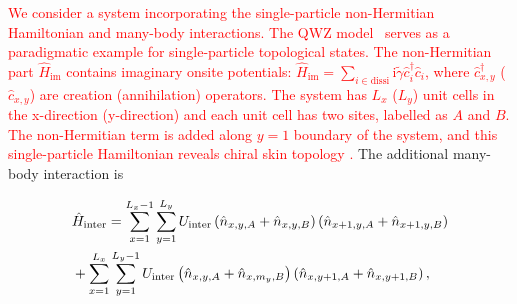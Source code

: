 \documentclass[longbibliography, aps, prx, amsmath, amssymb, amsfonts, twocolumn,superscriptaddress, footinbib]{revtex4-1}
\begin{document}
	 \textcolor{red}{
	We consider a system incorporating the single-particle non-Hermitian Hamiltonian 
	and many-body interactions. The QWZ model~\cite{qi2006topological} serves 
	as a paradigmatic example for single-particle topological states.
	}
	\textcolor{red}{
	The non-Hermitian part $\hat{H}_{\text{im}}$ contains imaginary onsite 
	potentials: $\hat{H}_{\text{im}} = \sum_{i\in \text{dissi}} \mathrm{i}\tilde{\gamma} 
	\hat{c}_i^{\dagger} \hat{c}_i$, where $\hat{c}_{{x}, {y}}^{\dagger}$ 
	($\hat{c}_{{x}, {y}}$) are creation (annihilation) operators. 
	The system has $L_x$ ($L_y$) unit cells in the x-direction (y-direction) and each unit cell has two sites, labelled as $A$ and $B$.
	The non-Hermitian term is added along $y=1$ boundary of the system, and this single-particle Hamiltonian reveals chiral skin topology \cite{nakamura2023universal, ma2024non, schindler2023hermitian}.
	}
    The additional many-body interaction is
        \begin{small}
		\begin{align}
			&\hat{H}_{\text{inter}}  = \sum_{{x}=1}^{L_{x}-1} \sum_{{y}=1}^{L_{y}}  U_{\text{inter}} \left(\hat{n}_{{x}, {y}, A}+\hat{n}_{{x}, {y}, B}\right) \left(\hat{n}_{{x}+1, {y}, A}+\hat{n}_{{x}+1, {y}, B}\right)\notag\\
			& + 
			\sum_{{x}=1}^{L_{x}} \sum_{{y}=1}^{L_{y}-1}  U_{\text{inter}} \left(\hat{n}_{{x}, {y}, A}+\hat{n}_{{x}, m_y, B}\right) \left(\hat{n}_{{x}, {y}+1, A}+\hat{n}_{{x}, {y}+1, B}\right), \label{eq:inter_cell}
		\end{align}
        \end{small}
\end{document}

